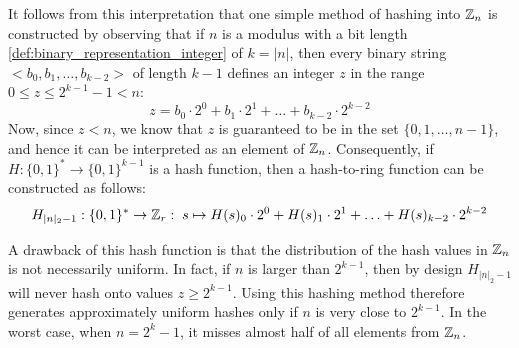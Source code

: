 It follows from this interpretation that one simple method of hashing into $\mathbb{Z}_n$ is constructed by observing that if $n$ is a modulus with a bit length \eqref{def:binary_representation_integer} of $k=|n|$, then every binary string $<b_0,b_1,\ldots,b_{k-2}>$ of length $k-1$ defines an integer $z$ in the range $0\leq z \leq 2^{k-1}-1< n $:
\begin{equation}
z = b_0\cdot 2^0 + b_1\cdot 2^1 + \ldots + b_{k-2}\cdot 2^{k-2}
\end{equation}
Now, since $z<n$, we know that $z$ is guaranteed to be in the set $\{0,1,\ldots,n-1\}$, and hence it can be interpreted as an element of $\mathbb{Z}_n$. Consequently, if $H:\{0,1\}^*\to\{0,1\}^{k-1}$ is a hash function, then a hash-to-ring function can be constructed as follows:
\begin{equation}\label{eq:hash-Zr}
H_{|n|_2-1}: \{0,1\}^* \to \mathbb{Z}_r: \; s \mapsto
H(s)_0\cdot 2^0 + H(s)_1\cdot 2^1 + \ldots + H(s)_{k-2}\cdot 2^{k-2}
\end{equation}

A drawback of this hash function is that the distribution of the hash values in $\mathbb{Z}_n$ is not necessarily uniform. In fact, if $n$ is larger than $2^{k-1}$, then by design $H_{|n|_2-1}$ will never hash onto values $z\geq 2^{k-1}$. Using this hashing method therefore generates approximately uniform hashes only if $n$ is very close to $2^{k-1}$. In the worst case, when $n=2^k-1$, it misses almost half of all elements from $\mathbb{Z}_n$.

